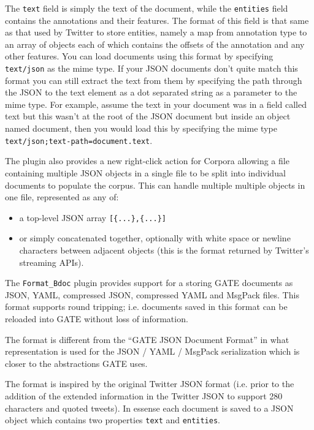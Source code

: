 The \texttt{text} field is simply the text of the document, while the
\texttt{entities} field contains the annotations and their features. The
format of this field is that same as that used by Twitter to store entities,
namely a map from annotation type to an array of objects each of which contains
the offsets of the annotation and any other features. You can load documents
using this format by specifying \texttt{text/json} as the mime type. If your
JSON documents don't quite match this format you can still extract the text
from them by specifying the path through the JSON to the text element as a
dot separated string as a parameter to the mime type. For example, assume
the text in your document was in a field called text but this wasn't at the
root of the JSON document but inside an object named document, then you would
load this by specifying the mime type \texttt{text/json;text-path=document.text}.

The plugin also provides a new right-click action for Corpora allowing a file
containing multiple JSON objects in a single file to be split into individual
documents to populate the corpus. This can handle multiple multiple objects
in one file, represented as any of:
\begin{itemize}
\item a top-level JSON array \verb![{...},{...}]!
\item or simply concatenated together, optionally with white space or newline
  characters between adjacent objects (this is the format returned by Twitter's
  streaming APIs).
\end{itemize}

%
%
The \verb!Format_Bdoc! plugin provides support for a storing GATE documents
as JSON, YAML, compressed JSON, compressed YAML and MsgPack files. 
This format supports round tripping; i.e. documents saved in
this format can be reloaded into GATE without loss of information.

The format is different from the ``GATE JSON Document Format'' in what representation
is used for the JSON / YAML / MsgPack serialization which is closer to the 
abstractions GATE uses. 

The format is inspired by the original Twitter JSON format (i.e. prior to the
addition of the extended information in the Twitter JSON to support 280 
characters and quoted tweets). In essense each document is saved to a JSON
object which contains two properties \texttt{text} and \texttt{entities}.

